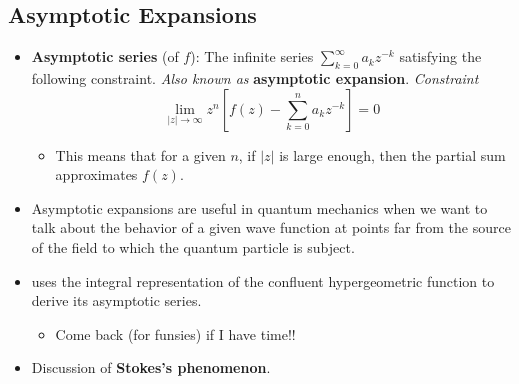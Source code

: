 \documentclass[../finalProject.tex]{subfiles}
\begin{document}
\subsection{Asymptotic Expansions}
\begin{itemize}
    \item \textbf{Asymptotic series} (of $f$): The infinite series $\sum_{k=0}^\infty a_kz^{-k}$ satisfying the following constraint. \emph{Also known as} \textbf{asymptotic expansion}. \emph{Constraint}
    \begin{equation*}
        \lim_{|z|\to\infty}z^n\left[ f(z)-\sum_{k=0}^na_kz^{-k} \right] = 0\tag{$n>0$}
    \end{equation*}
    \begin{itemize}
        \item This means that for a given $n$, if $|z|$ is large enough, then the partial sum approximates $f(z)$.
    \end{itemize}
    \item Asymptotic expansions are useful in quantum mechanics when we want to talk about the behavior of a given wave function at points far from the source of the field to which the quantum particle is subject.
    \item \textcite{bib:Seaborn} uses the integral representation of the confluent hypergeometric function to derive its asymptotic series.
    \begin{itemize}
        \item Come back (for funsies) if I have time!!
    \end{itemize}
    \item Discussion of \textbf{Stokes's phenomenon}.
\end{itemize}
\end{document}
